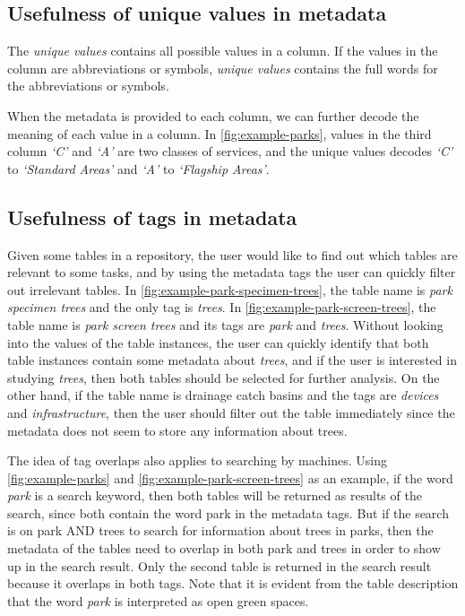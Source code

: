 \subsection{Usefulness of unique values in metadata}

The \textit{unique values} contains all possible values in a column. If the values in the column are abbreviations or symbols, \textit{unique values} contains the full words for the abbreviations or symbols.

When the metadata is provided to each column, we can further decode the meaning of each value in a column. In \autoref{fig:example-parks}, values in the third column \textit{`C'} and \textit{`A'} are two classes of services, and the unique values decodes \textit{`C'} to \textit{`Standard Areas'} and \textit{`A'} to \textit{`Flagship Areas'}.

\subsection{Usefulness of tags in metadata}

Given some tables in a repository, the user would like to find out which tables are relevant to some tasks, and by using the metadata tags the user can quickly filter out irrelevant tables. In \autoref{fig:example-park-specimen-trees}, the table name is \textit{park specimen trees} and the only tag is \textit{trees}. In \autoref{fig:example-park-screen-trees}, the table name is \textit{park screen trees} and its tags are \textit{park} and \textit{trees}. Without looking into the values of the table instances, the user can quickly identify that both table instances contain some metadata about \textit{trees}, and if the user is interested in studying \textit{trees}, then both tables should be selected for further analysis. On the other hand, if the table name is drainage catch basins and the tags are \textit{devices} and \textit{infrastructure}, then the user should filter out the table immediately since the metadata does not seem to store any information about trees.

The idea of tag overlaps also applies to searching by machines. Using \autoref{fig:example-parks} and \autoref{fig:example-park-screen-trees} as an example, if the word \textit{park} is a search keyword, then both tables will be returned as results of the search, since both contain the word park in the metadata tags. But if the search is on park AND trees to search for information about trees in parks, then the metadata of the tables need to overlap in both park and trees in order to show up in the search result. Only the second table is returned in the search result because it overlaps in both tags. Note that it is evident from the table description that the word \textit{park} is interpreted as open green spaces.

